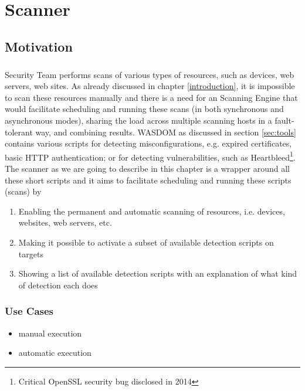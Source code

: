 \chapter{Scanner}
\label{chap4-scanner}
\thispagestyle{empty}

\section{Motivation}

\paragraph{}

Security Team performs scans of various types of resources, such as devices, web servers, web sites. As already discussed in chapter \ref{introduction}, it is impossible to scan these resources manually and there is a need for an Scanning Engine that would facilitate scheduling and running these scans (in both synchronous and asynchronous modes), sharing the load across multiple scanning hosts in a fault-tolerant way, and combining results.
WASDOM as discussed in section \ref{sec:tools} contains various scripts for detecting misconfigurations, e.g. expired certificates, basic HTTP authentication; or for detecting vulnerabilities, such as Heartbleed\footnote{Critical OpenSSL security bug disclosed in 2014}. The scanner as we are going to describe in this chapter is a wrapper around all these short scripts and it aims to facilitate scheduling and running these scripts (scans) by
\begin{enumerate}
\item Enabling the permanent and automatic scanning of resources, i.e. devices, websites, web servers, etc.
\item Making it possible to activate a subset of available detection scripts on targets
\item Showing a list of available detection scripts with an explanation of what kind of detection each does
\end{enumerate} 

\subsection{Use Cases}
\begin{itemize}
\item manual execution
\item automatic execution
\end{itemize}

